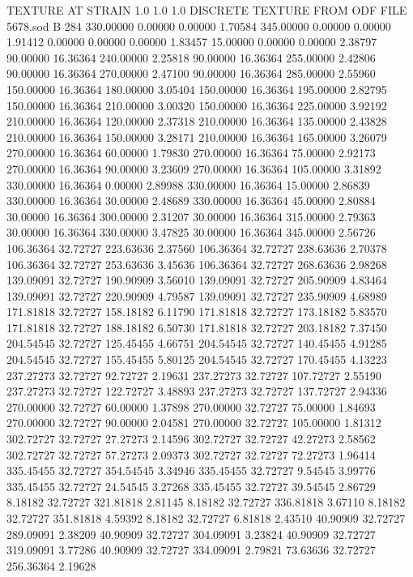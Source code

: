 TEXTURE AT STRAIN
   1.0   1.0   1.0
DISCRETE TEXTURE FROM ODF FILE  5678.sod                                
B    284
330.00000 0.00000 0.00000 1.70584
345.00000 0.00000 0.00000 1.91412
0.00000 0.00000 0.00000 1.83457
15.00000 0.00000 0.00000 2.38797
90.00000 16.36364 240.00000 2.25818
90.00000 16.36364 255.00000 2.42806
90.00000 16.36364 270.00000 2.47100
90.00000 16.36364 285.00000 2.55960
150.00000 16.36364 180.00000 3.05404
150.00000 16.36364 195.00000 2.82795
150.00000 16.36364 210.00000 3.00320
150.00000 16.36364 225.00000 3.92192
210.00000 16.36364 120.00000 2.37318
210.00000 16.36364 135.00000 2.43828
210.00000 16.36364 150.00000 3.28171
210.00000 16.36364 165.00000 3.26079
270.00000 16.36364 60.00000 1.79830
270.00000 16.36364 75.00000 2.92173
270.00000 16.36364 90.00000 3.23609
270.00000 16.36364 105.00000 3.31892
330.00000 16.36364 0.00000 2.89988
330.00000 16.36364 15.00000 2.86839
330.00000 16.36364 30.00000 2.48689
330.00000 16.36364 45.00000 2.80884
30.00000 16.36364 300.00000 2.31207
30.00000 16.36364 315.00000 2.79363
30.00000 16.36364 330.00000 3.47825
30.00000 16.36364 345.00000 2.56726
106.36364 32.72727 223.63636 2.37560
106.36364 32.72727 238.63636 2.70378
106.36364 32.72727 253.63636 3.45636
106.36364 32.72727 268.63636 2.98268
139.09091 32.72727 190.90909 3.56010
139.09091 32.72727 205.90909 4.83464
139.09091 32.72727 220.90909 4.79587
139.09091 32.72727 235.90909 4.68989
171.81818 32.72727 158.18182 6.11790
171.81818 32.72727 173.18182 5.83570
171.81818 32.72727 188.18182 6.50730
171.81818 32.72727 203.18182 7.37450
204.54545 32.72727 125.45455 4.66751
204.54545 32.72727 140.45455 4.91285
204.54545 32.72727 155.45455 5.80125
204.54545 32.72727 170.45455 4.13223
237.27273 32.72727 92.72727 2.19631
237.27273 32.72727 107.72727 2.55190
237.27273 32.72727 122.72727 3.48893
237.27273 32.72727 137.72727 2.94336
270.00000 32.72727 60.00000 1.37898
270.00000 32.72727 75.00000 1.84693
270.00000 32.72727 90.00000 2.04581
270.00000 32.72727 105.00000 1.81312
302.72727 32.72727 27.27273 2.14596
302.72727 32.72727 42.27273 2.58562
302.72727 32.72727 57.27273 2.09373
302.72727 32.72727 72.27273 1.96414
335.45455 32.72727 354.54545 3.34946
335.45455 32.72727 9.54545 3.99776
335.45455 32.72727 24.54545 3.27268
335.45455 32.72727 39.54545 2.86729
8.18182 32.72727 321.81818 2.81145
8.18182 32.72727 336.81818 3.67110
8.18182 32.72727 351.81818 4.59392
8.18182 32.72727 6.81818 2.43510
40.90909 32.72727 289.09091 2.38209
40.90909 32.72727 304.09091 3.23824
40.90909 32.72727 319.09091 3.77286
40.90909 32.72727 334.09091 2.79821
73.63636 32.72727 256.36364 2.19628
